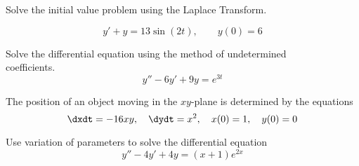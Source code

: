 \documentclass[12pt]{exam}
\begin{document}
\begin{questions}



    \newpage  	
 	
    \question[10] Solve the initial value problem using the Laplace Transform. 
    
    $$y' + y = 13\sin(2t),  \qquad y(0) = 6$$

    
    \newpage 
    
    \question[8] Solve the differential equation using the method of undetermined \\coefficients. $$y'' - 6y' + 9y = e^{3t}$$
    
   
    \newpage

    \question[10] The position of an object moving in the $xy$-plane is determined by the equations
    $$ \dxdt = -16xy, \quad \dydt = x^2, \quad x(0) = 1, \quad y(0) = 0$$ %
    
    
    
    \newpage 

    \question[12] Use variation of parameters to solve the differential equation $$y'' - 4y' + 4y = (x+1)e^{2x}$$
    

    
\end{questions}
\end{document}
